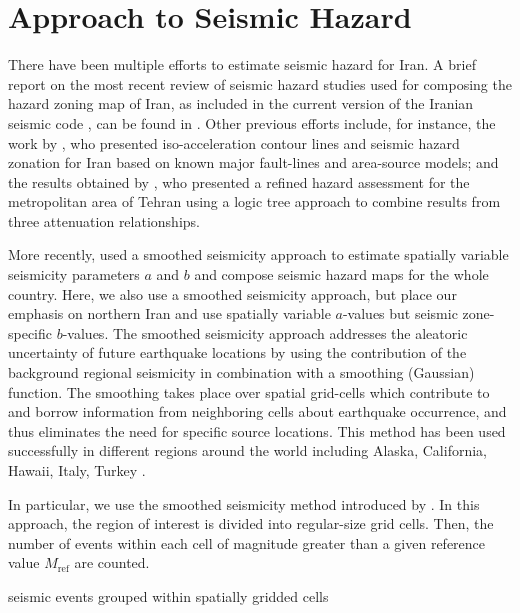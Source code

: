 
\section{Approach to Seismic Hazard}

There have been multiple efforts to estimate seismic hazard for Iran. A brief report on the most recent review of seismic hazard studies used for composing the hazard zoning map of Iran, as included in the current version of the Iranian seismic code \citep{BHRC2014}, can be found in \citet{Moinfar_2012_WCEE}. Other previous efforts include, for instance, the work by \citet{Tavakoli1999}, who presented iso-acceleration contour lines and seismic hazard zonation for Iran based on known major fault-lines and area-source models; and the results obtained by \citet{Ghodrati2003}, who presented a refined hazard assessment for the metropolitan area of Tehran using a logic tree approach to combine results from three attenuation relationships. 

More recently, \citet{Khodaverdian_2016_BSSA} used a smoothed seismicity approach to estimate spatially variable seismicity parameters $a$ and $b$ \citep{Gutenberg1944} and compose seismic hazard maps for the whole country. Here, we also use a smoothed seismicity approach, but place our emphasis on northern Iran and use spatially variable $a$-values but seismic zone-specific $b$-values. The smoothed seismicity approach addres\-ses the aleatoric uncertainty of future earthquake locations by using the contribution of the background regional seismicity in combination with a smoothing (Gaussian) function. The smoothing takes place over spatial grid-cells which contribute to and borrow information from neighboring cells about earthquake occurrence, and thus eliminates the need for specific source locations. This method has been used successfully in different regions around the world including Alaska, California, Hawaii, Italy, Turkey \citep[e.g.,][]{Cao1996, Klein2001, Akinci2004, Kalkan2009, Moschetti2014}.

In particular, we use the smoothed seismicity method introduced by \citet{Frankel1995}. In this approach, the region of interest is divided into regular-size grid cells. Then, the number of events within each cell of magnitude greater than a given reference value $M_{\mathrm{ref}}$ are counted.

seismic events grouped within spatially gridded cells 





